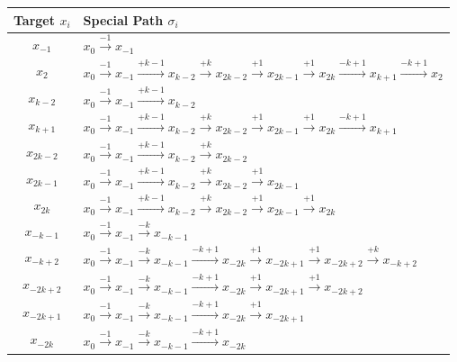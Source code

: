 
\begin{center}
  \begin{tabular}{|c|l|}
 \hline
 Target $x_i$ & Special Path $\sigma_i$\\
 \hline
  $x_{-1}$ &  $x_{0}\xrightarrow {-1} x_{-1}$\\
  $x_{2}$ &  $x_{0}\xrightarrow {-1} x_{-1} \xrightarrow {+k-1}x_{k-2}\xrightarrow {+k}x_{2k-2} \xrightarrow {+1} x_{2k-1}\xrightarrow {+1}x_{2k} \xrightarrow {-k+1} x_{k+1}\xrightarrow {-k+1}x_{2}$\\

  $x_{k-2}$ &  $x_{0} \xrightarrow {-1}x_{-1}\xrightarrow {+k-1}x_{k-2}$\\
  $x_{k+1}$ &  $x_{0}\xrightarrow {-1} x_{-1} \xrightarrow {+k-1}x_{k-2}\xrightarrow {+k}x_{2k-2} \xrightarrow {+1} x_{2k-1}\xrightarrow {+1}x_{2k} \xrightarrow {-k+1} x_{k+1}$\\
 
  $x_{2k-2}$ &  $x_{0}\xrightarrow {-1} x_{-1} \xrightarrow {+k-1}x_{k-2}\xrightarrow {+k}x_{2k-2} $\\

   $x_{2k-1}$ &  $x_{0}\xrightarrow {-1} x_{-1} \xrightarrow {+k-1}x_{k-2}\xrightarrow {+k}x_{2k-2} \xrightarrow {+1}x_{2k-1} $\\

$x_{2k}$ &   $ x_{0} \xrightarrow {-1} x_{-1} \xrightarrow {+k-1} x_{k-2} \xrightarrow {+k} x_{2k-2} \xrightarrow {+1}  x_{2k-1}\xrightarrow {+1}  x_{2k}$\\
  
 $x_{-k-1}$ & $ x_{0} \xrightarrow {-1} x_{-1} \xrightarrow {-k} x_{-k-1}$\\
 $x_{-k+2}$ & $x_{0}\xrightarrow {-1} x_{-1} \xrightarrow {-k}x_{-k-1}\xrightarrow {-k+1}x_{-2k} \xrightarrow {+1} x_{-2k+1}\xrightarrow {+1}x_{-2k+2} \xrightarrow {+k} x_{-k+2}$\\

 $x_{-2k+2}$ & $x_{0}\xrightarrow {-1} x_{-1} \xrightarrow {-k}x_{-k-1}\xrightarrow {-k+1}x_{-2k} \xrightarrow {+1} x_{-2k+1}\xrightarrow {+1}x_{-2k+2} $\\
$x_{-2k+1}$ & $x_{0}\xrightarrow {-1} x_{-1} \xrightarrow {-k}x_{-k-1}\xrightarrow {-k+1}x_{-2k} \xrightarrow {+1} x_{-2k+1} $\\

 $x_{-2k}$  & $x_{0} \xrightarrow {-1} x_{-1} \xrightarrow {-k} x_{-k-1} \xrightarrow {-k+1} x_{-2k} $\\
 \hline
 \end{tabular}
 \end{center}
 

